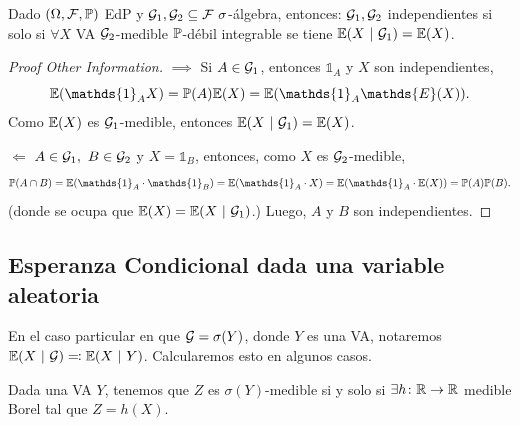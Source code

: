 
\begin{prop}
	Dado $(\Omega, \mathcal{F}, \mathbb{P})$ EdP y $\mathcal{G}_{1}, \mathcal{G}_{2} \subseteq \mathcal{F} \ \sigma$-álgebra, entonces: $\mathcal{G}_{1}, \mathcal{G}_{2}$ independientes si  solo si $\forall X$ VA $\mathcal{G}_{2}$-medible $\mathbb{P}$-débil integrable se tiene $\mathbb{E}(X \ | \ \mathcal{G}_{1}) = \mathbb{E}(X)$.
\end{prop}
\begin{proof}[Proof Other Information]
	$\boxed{\implies}$ Si $A \in \mathcal{G}_{1}$, entonces $\mathds{1}_{A}$ y $X$ son independientes,
	\[ \mbb{E}(\mathds{1}_{A} X) = \mbb{P}(A) \mbb{E}(X) = \mbb{E}(\mathds{1}_{A} \mathds{E}(X)). \]
	Como $\mathbb{E}(X)$ es $\mathcal{G}_{1}$-medible, entonces $\mathbb{E}(X \ | \ \mathcal{G}_{1}) = \mathbb{E}(X)$. \par
	$\boxed{\Leftarrow}$ $A \in \mathcal{G}_{1},\ B \in \mathcal{G}_{2}$ y $X = \mathds{1}_{B}$, entonces, como $X$ es $\mathcal{G}_{2}$-medible,
	\[ \mbb{P}(A \cap B) = \mbb{E}(\mathds{1}_{A} \cdot \mathds{1}_{B}) = \mbb{E}(\mathds{1}_{A} \cdot X) = \mbb{E}(\mathds{1}_{A} \cdot \mbb{E}(X)) = \mbb{P}(A) \mbb{P}(B). \]
	(donde se ocupa que $\mbb{E}(X) = \mbb{E}(X \ | \ \mcal{G}_{1})$.) Luego, $A$ y $B$ son independientes.
\end{proof}

\subsection{Esperanza Condicional dada una variable aleatoria}

En el caso particular en que $\mathcal{G} = \sigma(Y)$, donde $Y$ es una VA, notaremos $\mbb{E}(X \ | \ \mcal{G}) \eqcolon \mbb{E}(X \ | \ Y)$. Calcularemos esto en algunos casos.

\begin{lemma}
	Dada una VA $Y$, tenemos que $Z$ es $\sigma(Y)$-medible si y solo si $\exists h \colon \mathbb{R} \to \mathbb{R}$ medible Borel tal que $Z = h(X)$.
\end{lemma}
\medskip

